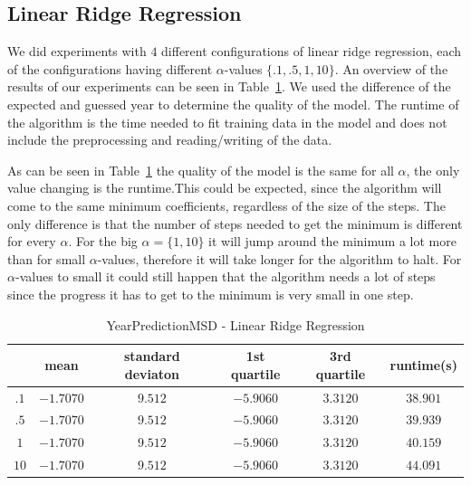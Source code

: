 \subsection{Linear Ridge Regression}
We did experiments with $4$ different configurations of linear ridge regression, each of the configurations having different $\alpha$-values $\{.1,.5,1,10\}$. An overview of the results of our experiments can be seen in Table~\ref{ypmsd:table:lrrresults}. We used the difference of the expected and guessed year to determine the quality of the model. The runtime of the algorithm is the time needed to fit training data in the model and does not include the preprocessing and reading/writing of the data.\par
As can be seen in Table~\ref{ypmsd:table:lrrresults} the quality of the model is the same for all $\alpha$, the only value changing is the runtime.This could be expected, since the algorithm will come to the same minimum coefficients, regardless of the size of the steps. The only difference is that the number of steps needed to get the minimum is different for every $\alpha$. For the big $\alpha=\{1,10\}$ it will jump around the minimum a lot more than for small $\alpha$-values, therefore it will take longer for the algorithm to halt. For $\alpha$-values to small it could still happen that the algorithm needs a lot of steps since the progress it has to get to the minimum is very small in one step.
\begin{table}[p]
	\begin{center}
		\begin{tabular}{|c|c|c|c|c|c|}
			\hline	\backslashbox{$\alpha$}{}&mean&standard deviaton&1st quartile&3rd quartile&runtime(s)\\
\hline$.1$&$-1.7070$&$9.512$&$-5.9060$&$3.3120$&$38.901$\\
\hline$.5$&$-1.7070$&$9.512$&$-5.9060$&$3.3120$&$39.939$\\
\hline$1$&$-1.7070$&$9.512$&$-5.9060$&$3.3120$&$40.159$\\
\hline$10$&$-1.7070$&$9.512$&$-5.9060$&$3.3120$&$44.091$\\\hline
\end{tabular}
\end{center}
\caption{YearPredictionMSD - Linear Ridge Regression\label{ypmsd:table:lrrresults}}
\end{table}
